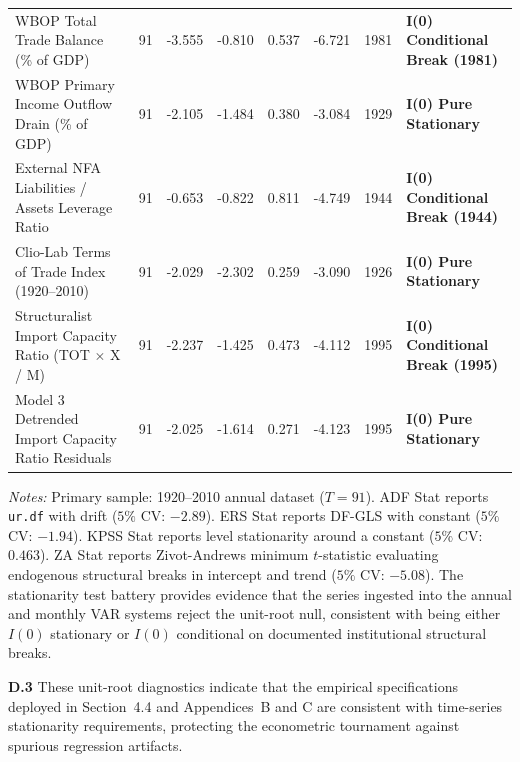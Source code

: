 \begin{landscape}
\begin{table}[p]
\begin{tabular}{l c c c c c c l}
WBOP Total Trade Balance (\% of GDP) & 91 & -3.555 & -0.810 & 0.537 & -6.721 & 1981 & \textbf{I(0) Conditional Break (1981)} \\
WBOP Primary Income Outflow Drain (\% of GDP) & 91 & -2.105 & -1.484 & 0.380 & -3.084 & 1929 & \textbf{I(0) Pure Stationary} \\
External NFA Liabilities / Assets Leverage Ratio & 91 & -0.653 & -0.822 & 0.811 & -4.749 & 1944 & \textbf{I(0) Conditional Break (1944)} \\
Clio-Lab Terms of Trade Index (1920--2010) & 91 & -2.029 & -2.302 & 0.259 & -3.090 & 1926 & \textbf{I(0) Pure Stationary} \\
Structuralist Import Capacity Ratio (TOT $\times$ X / M) & 91 & -2.237 & -1.425 & 0.473 & -4.112 & 1995 & \textbf{I(0) Conditional Break (1995)} \\
Model 3 Detrended Import Capacity Ratio Residuals & 91 & -2.025 & -1.614 & 0.271 & -4.123 & 1995 & \textbf{I(0) Pure Stationary} \\
\bottomrule
\end{tabular}
\begin{minipage}{0.95\linewidth}
\vspace{0.4em}
\footnotesize
\textit{Notes:} Primary sample: 1920--2010 annual dataset ($T=91$). ADF Stat reports \texttt{ur.df} with drift ($5\%$ CV: $-2.89$). ERS Stat reports DF-GLS with constant ($5\%$ CV: $-1.94$). KPSS Stat reports level stationarity around a constant ($5\%$ CV: $0.463$). ZA Stat reports Zivot-Andrews minimum $t$-statistic evaluating endogenous structural breaks in intercept and trend ($5\%$ CV: $-5.08$). The stationarity test battery provides evidence that the series ingested into the annual and monthly VAR systems reject the unit-root null, consistent with being either $I(0)$ stationary or $I(0)$ conditional on documented institutional structural breaks.
\end{minipage}
\end{table}
\end{landscape}

\textbf{D.3} These unit-root diagnostics indicate that the empirical specifications deployed in Section~4.4 and Appendices~B and C are consistent with time-series stationarity requirements, protecting the econometric tournament against spurious regression artifacts.
